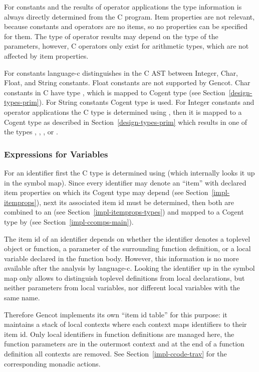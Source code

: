 For constants and the results of operator applications the type information is always directly determined from the
C program. Item properties are not relevant, because constants and operators are no items, so no properties can be
specified for them. The type of operator results may depend on the type of the parameters, however, C operators
only exist for arithmetic types, which are not affected by item properties.

For constants language-c distinguishes in the C AST between Integer, Char, Float, and String constants. Float
constants are not supported by Gencot. Char constants in C have type , which is mapped to Cogent type
 (see Section~\ref{design-types-prim}). For String constants Cogent type  is used.
For Integer constants and operator applications the C type is determined using , then it is mapped to a
Cogent type as described in Section~\ref{design-types-prim} which results in one of the types , ,
, or .

\subsubsection{Expressions for Variables}

For an identifier first the C type is determined using  (which internally looks it up in the symbol map).
Since every identifier may denote an ``item'' with declared item properties on which its Cogent type may depend
(see Section~\ref{impl-itemprops}), next its associated item id must be determined, then both are combined to an
 (see Section~\ref{impl-itemprops-types}) and mapped to a Cogent type by 
(see Section~\ref{impl-ccomps-main}).

The item id of an identifier depends on whether the identifier denotes a toplevel object or function, a parameter
of the surrounding function definition, or a local variable declared in the function body. However, this information is
no more available after the analysis by language-c. Looking the identifier up in the symbol map only allows to
distinguish toplevel definitions from local declarations, but neither parameters from local variables, nor different
local variables with the same name.

Therefore Gencot implements its own ``item id table'' for this purpose: it maintains a stack of local contexts
where each context maps identifiers to their item id. Only local identifiers in function definitions are managed here,
the function parameters are in the outermost context and at the end of a function definition all contexts are removed.
See Section~\ref{impl-ccode-trav} for the corresponding monadic actions.

